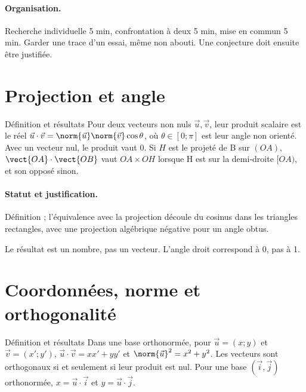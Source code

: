 \paragraph{Organisation.} Recherche individuelle 5 min, confrontation à deux 5 min, mise en commun 5 min. Garder une trace d’un essai, même non abouti. Une conjecture doit ensuite être justifiée.
\section{Projection et angle}\label{C03-U1}
\begin{repere}{Définition et résultats}
Pour deux vecteurs non nuls $\vec u,\vec v$, leur produit scalaire est le réel $\vec u\cdot\vec v=\norm{\vec u}\norm{\vec v}\cos\theta$, où $\theta\in[0;\pi]$ est leur angle non orienté. Avec un vecteur nul, le produit vaut 0. Si $H$ est le projeté de B sur $(OA)$, $\vect{OA}\cdot\vect{OB}$ vaut $OA\times OH$ lorsque H est sur la demi-droite $[OA)$, et son opposé sinon.
\end{repere}
\paragraph{Statut et justification.} Définition ; l’équivalence avec la projection découle du cosinus dans les triangles rectangles, avec une projection algébrique négative pour un angle obtus.
\label{C03-EX1}

\begin{erreur}Le résultat est un nombre, pas un vecteur. L’angle droit correspond à 0, pas à 1.\end{erreur}
\label{C03-AP1}
\section{Coordonnées, norme et orthogonalité}\label{C03-U2}
\begin{repere}{Définition et résultats}
Dans une base orthonormée, pour $\vec u=(x;y)$ et $\vec v=(x\prime;y\prime)$, $\vec u\cdot\vec v=xx\prime+yy\prime$ et $\norm{\vec u}^2=x^2+y^2$. Les vecteurs sont orthogonaux si et seulement si leur produit est nul. Pour une base $(\vec i,\vec j)$ orthonormée, $x=\vec u\cdot\vec i$ et $y=\vec u\cdot\vec j$.
\end{repere}
